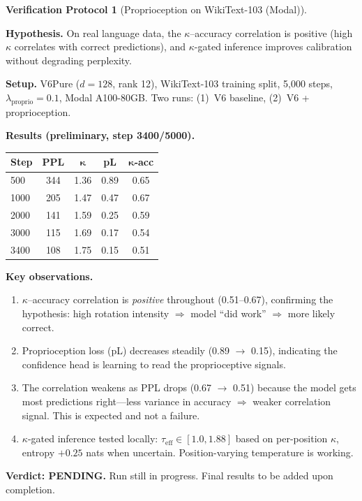 \documentclass[11pt,a4paper]{article}
\theoremstyle{definition}
\newtheorem{protocol}[theorem]{Verification Protocol}
\theoremstyle{remark}
\begin{document}
\begin{protocol}[Proprioception on WikiText-103 (Modal)]
\label{prot:proprioception_modal}
\statuspending

\textbf{Hypothesis.} On real language data, the $\kappa$--accuracy 
correlation is positive (high $\kappa$ correlates with correct 
predictions), and $\kappa$-gated inference improves calibration 
without degrading perplexity.

\textbf{Setup.} V6Pure ($d = 128$, rank 12), WikiText-103 training 
split, 5{,}000 steps, $\lambda_{\mathrm{proprio}} = 0.1$, Modal 
A100-80GB. Two runs: (1)~V6 baseline, (2)~V6 + proprioception.

\textbf{Results (preliminary, step 3400/5000).}
\begin{center}
\begin{tabular}{lcccc}
\toprule
\textbf{Step} & \textbf{PPL} & $\bm{\kappa}$ & 
\textbf{pL} & $\bm{\kappa}$\textbf{-acc} \\
\midrule
500 & 344 & 1.36 & 0.89 & 0.65 \\
1000 & 205 & 1.47 & 0.47 & 0.67 \\
2000 & 141 & 1.59 & 0.25 & 0.59 \\
3000 & 115 & 1.69 & 0.17 & 0.54 \\
3400 & 108 & 1.75 & 0.15 & 0.51 \\
\bottomrule
\end{tabular}
\end{center}

\textbf{Key observations.}
\begin{enumerate}[nosep,label=(\roman*)]
    \item $\kappa$--accuracy correlation is \emph{positive} 
    throughout (0.51--0.67), confirming the hypothesis: high 
    rotation intensity $\Rightarrow$ model ``did work'' 
    $\Rightarrow$ more likely correct.
    
    \item Proprioception loss (pL) decreases steadily 
    (0.89 $\to$ 0.15), indicating the confidence head is 
    learning to read the proprioceptive signals.
    
    \item The correlation weakens as PPL drops (0.67 $\to$ 0.51) 
    because the model gets most predictions right---less variance 
    in accuracy $\Rightarrow$ weaker correlation signal. This is 
    expected and not a failure.
    
    \item $\kappa$-gated inference tested locally: 
    $\tau_{\mathrm{eff}} \in [1.0, 1.88]$ based on per-position 
    $\kappa$, entropy $+0.25$ nats when uncertain. Position-varying 
    temperature is working.
\end{enumerate}

\textbf{Verdict: PENDING.} Run still in progress. Final results 
to be added upon completion.
\end{protocol}
\end{document}
